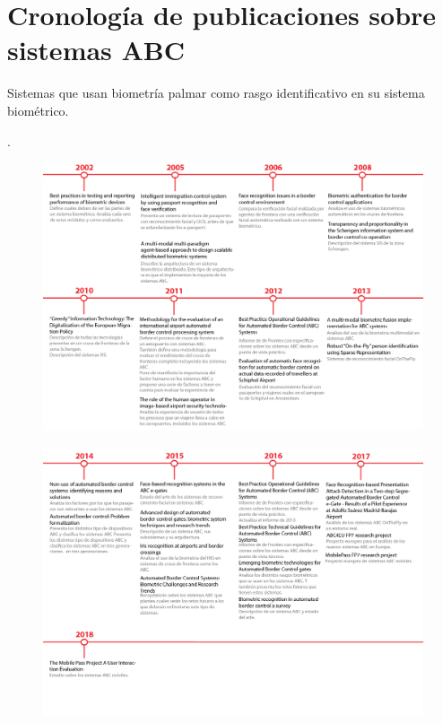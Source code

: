 \chapter{Cronología de publicaciones sobre sistemas ABC}\label{apendix:ApendiceCronologiaABC}

Sistemas  que usan biometría palmar como rasgo identificativo en su sistema biométrico.

\cite{nanavati2011biometric}.

\begin{landscape}
 \begin{figure}
  \centering
  \includegraphics[width=1.4\textwidth]{ch-sistemasABC/images/ch-ImagenesApendices/00_CRONOLOGIA_ABC.png}
  \label{fig:00_CRONOLOGIA_ABC}
 \end{figure}
\end{landscape}

\begin{landscape}
 \begin{figure}
  \centering
  \includegraphics[width=1.4\textwidth]{ch-sistemasABC/images/ch-ImagenesApendices/01_CRONOLOGIA_ABC.png}
  \label{fig:01_CRONOLOGIA_ABC}
 \end{figure}
\end{landscape}

